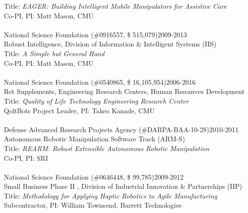 \documentclass[10pt]{article}
\begin{document}
Title: \textit{ EAGER: Building Intelligent Mobile Manipulators for Assistive Care
}\\
Co-PI, PI: Matt Mason, CMU\\
\\
National Science Foundation (\#0916557, \$ 515,079)\hfill 2009-2013\\
Robust Intelligence, Division of Information \& Intelligent Systems (IIS)\\
Title: \textit{A Simple but General Hand}\\
Co-PI, PI: Matt Mason, CMU\\
\\
National Science Foundation (\#0540865, \$ 16,105,954)\hfill 2006-2016\\
Ret Supplements, Engineering Research Centers, Human Resources Development\\
Title: \textit{Quality of Life Technology Engineering Research Center}\\
QoltBots Project Leader, PI: Takeo Kanade, CMU\\
\\
Defense Advanced Research Projects Agency (\#DARPA-BAA-10-28)\hfill 2010-2011\\
Autonomous Robotic Manipulation Software Track (ARM-S)\\
Title: \textit{REARM: Robust Extensible Autonomous Robotic Manipulation}\\
Co-PI, PI: SRI\\
\\
National Science Foundation (\#0646448, \$ 99,785)\hfill 2009-2012\\
Small Business Phase II , Division of Industrial Innovation \& Partnerships (IIP)\\
Title: \textit{Methodology for Applying Haptic Robotics to Agile Manufacturing}\\
Subcontractor, PI: William Townsend, Barrett Technologies\\
\end{document}
